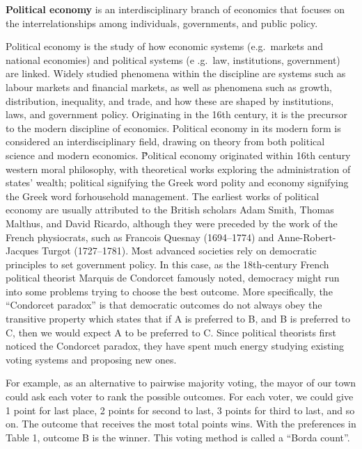 \textbf{Political economy} is an interdisciplinary branch of economics that focuses on the interrelationships among
individuals, governments, and public policy.
\ed

Political economy is the study of how economic systems (e.g.\ markets and national economies) and political systems (e
.g.\ law, institutions, government) are linked. Widely studied phenomena within the discipline are systems
such as labour markets and financial markets, as well as phenomena such as growth, distribution, inequality, and
trade, and how these are shaped by institutions, laws, and government policy. Originating in the 16th century, it is
the precursor to the modern discipline of economics. Political economy in its modern form is considered an
interdisciplinary field, drawing on theory from both political science and modern economics. \v

Political economy originated within 16th century western moral philosophy, with theoretical works exploring the
administration of states' wealth; political signifying the Greek word polity and economy signifying the Greek
word forhousehold management. The earliest works of political economy are usually attributed to the British
scholars Adam Smith, Thomas Malthus, and David Ricardo, although they were preceded by the work of the French
physiocrats, such as Francois Quesnay (1694–1774) and Anne-Robert-Jacques Turgot (1727–1781). \v

Most advanced societies rely on democratic principles to set government policy. In this case, as the 18th-century
French political theorist Marquis de Condorcet famously noted, democracy might run into some problems trying to
choose the best outcome. More specifically, the ``Condorcet paradox'' is that democratic outcomes do not always obey
the transitive property which states that if A is preferred to B, and B is preferred to C, then we would expect A to
be preferred to C. Since political theorists first noticed the Condorcet paradox, they have spent much energy studying
existing voting systems and proposing new ones.

\be
For example, as an alternative to pairwise majority voting, the mayor of our town could ask each voter to rank
the possible outcomes. For each voter, we could give 1 point for last place, 2 points for second to last, 3 points
for third to last, and so on. The outcome that receives the most total points wins. With the preferences in Table 1,
outcome B is the winner. This voting method is called a ``Borda count''.
\ee

